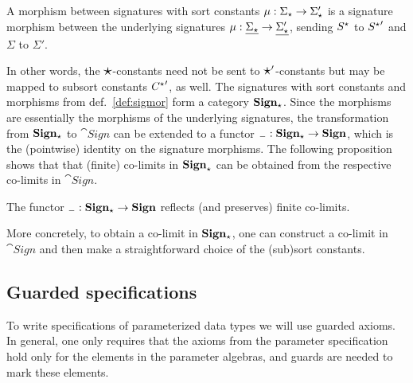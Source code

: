 \begin{definition}\label{def:sigmor}
A morphism between signatures with sort constants $\mu:\Sigma_\star \to
\Sigma'_{\star}$ is a signature morphism between the underlying
signatures $\mu:\underline{\Sigma_\star}\to\underline{\Sigma'_\star}$, sending
$S^\star$ to ${S^\star}'$ and $\Sigma$ to $\Sigma'$.
\end{definition}
In other words, the $\mbox{\Large{$\star$}}$-constants need not be sent to $\mbox{\Large{$\star$}}'$-constants
but may be mapped to subsort constants ${C^\star}'$, as well.
The signatures with sort constants and morphisms from def.~\ref{def:sigmor}
form a category ${\bf Sign_\star}$. 
Since the morphisms are essentially the morphisms of the underlying
signatures,  the transformation from ${\bf Sign_\star}$ to $\cat{Sign}$
can be extended to a functor ${\sf {_-}}:{\bf Sign_\star} \to
{\bf Sign}$, which is the (pointwise) identity on the signature morphisms. 
The following proposition shows that
 that (finite) co-limits in ${\bf Sign}_\star$
can be obtained from the respective co-limits in $\cat{Sign}$. 

\begin{proposition}\label{prop:finco}
The functor ${\sf {_-}}:{\bf Sign_\star} \to {\bf Sign}$ reflects (and
preserves) finite co-limits.
\end{proposition}
%
More concretely, to obtain a co-limit in ${\bf Sign_\star}$, one can construct a co-limit in $\cat{Sign}$ and
then make a straightforward choice of the (sub)sort constants.

\subsection{Guarded specifications}
To write specifications of parameterized data types we will use guarded
axioms. In general, one only requires that the axioms from the parameter specification
hold only for the elements in the parameter algebras, and guards are needed to mark these elements.

